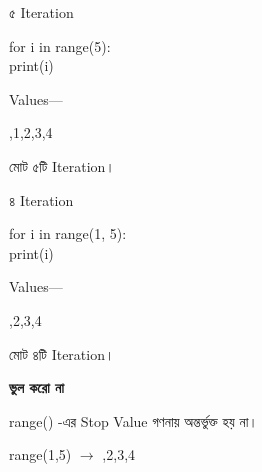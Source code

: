 

\noindent
\begin{minipage}[t]{0.49\linewidth}

\begin{sideexamplebox}{৫ Iteration}

\begin{sidecodebox}
\begin{english}
\ttfamily
for i in range(5):\\
\hspace*{4mm}print(i)
\end{english}
\end{sidecodebox}

Values—

\begin{center}
\textenglish{,1,2,3,4}
\end{center}

মোট ৫টি Iteration।

\end{sideexamplebox}

\end{minipage}
\hfill
\begin{minipage}[t]{0.49\linewidth}

\begin{sideexamplebox}{৪ Iteration}

\begin{sidecodebox}
\begin{english}
\ttfamily
for i in range(1, 5):\\
\hspace*{4mm}print(i)
\end{english}
\end{sidecodebox}

Values—

\begin{center}
\textenglish{,2,3,4}
\end{center}

মোট ৪টি Iteration।

\end{sideexamplebox}

\end{minipage}

\begin{rememberbox}

\textbf{\color{deepOrange}ভুল করো না}

\textenglish{\ttfamily range()}
-এর Stop Value গণনায় অন্তর্ভুক্ত হয় না।

\begin{center}

\textenglish{\ttfamily range(1,5)}
\(\longrightarrow\)
\textenglish{,2,3,4}

\end{center}

\end{rememberbox}

